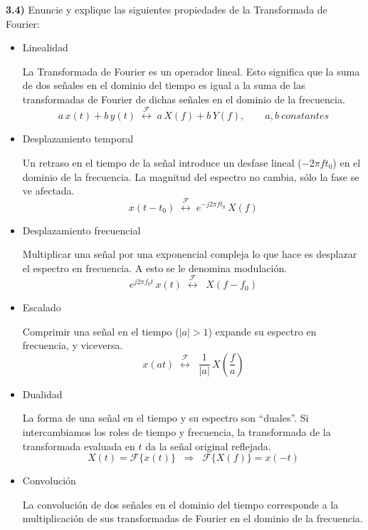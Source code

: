 \noindent \textbf{3.4)} Enuncie y explique las siguientes propiedades de la Transformada de Fourier:
\begin{itemize}
    \item Linealidad

    La Transformada de Fourier es un operador lineal. Esto significa que la suma de dos señales en el dominio del tiempo es igual a la suma de las transformadas de Fourier de dichas señales en el dominio de la frecuencia.
        \[
       a\,x(t) + b\,y(t) \;\overset{\mathcal{F}}{\longleftrightarrow}\;  a\,X(f) + b\,Y(f), \qquad 
       a,b\ constantes
        \]
        
    \item Desplazamiento temporal

    Un retraso en el tiempo de la señal introduce un desfase lineal ($-2\pi f t_0$) en el dominio de la frecuencia.  
    La magnitud del espectro no cambia, sólo la fase se ve afectada.
        \[
            x(t - t_0) \;\overset{\mathcal{F}}{\longleftrightarrow}\;e^{-j 2\pi f t_0}\, X(f)
        \]
    \item Desplazamiento frecuencial
    
        Multiplicar una señal por una exponencial compleja lo que hace es desplazar el espectro en frecuencia.  
        A esto se le denomina modulación.
        \[
        e^{j 2\pi f_0 t}\, x(t)\;\overset{\mathcal{F}}{\longleftrightarrow}\;
       \;
        X(f - f_0)
        \]



    \item Escalado
    
        Comprimir una señal en el tiempo ($|a|>1$) expande su espectro en frecuencia, y viceversa.
        \[
        x(at)\;\overset{\mathcal{F}}{\longleftrightarrow}\;
       \;\frac{1}{|a|}\,X\!\left(\frac{f}{a}\right)
        \]

    \item Dualidad

        La forma de una señal en el tiempo y su espectro son ``duales''.  
        Si intercambiamos los roles de tiempo y frecuencia, la transformada de la transformada evaluada en $t$ da la señal original reflejada.
        \[
        X(t) = \mathcal{F}\{x(t)\} \;\;\Longrightarrow\;\; \mathcal{F}\{X(f)\} = x(-t)
        \]

    \item Convolución

     La convolución de dos señales en el dominio del tiempo corresponde a la multiplicación de sus transformadas de Fourier en el dominio de la frecuencia.
 

\end{itemize}
